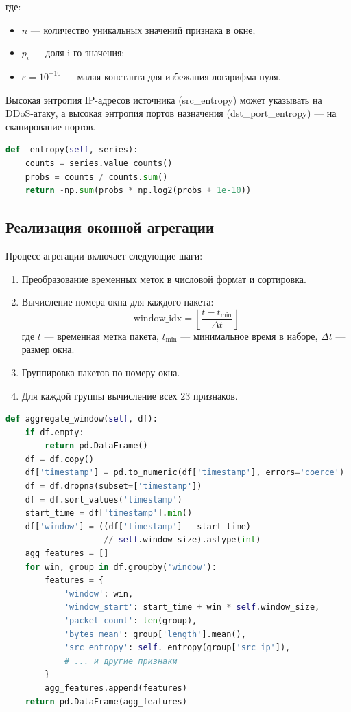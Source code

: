 где:
\begin{itemize}
    \item \(n\) — количество уникальных значений признака в окне;
    \item \(p_i\) — доля i-го значения;
    \item \(\varepsilon = 10^{-10}\) — малая константа для избежания логарифма нуля.
\end{itemize}

Высокая энтропия IP-адресов источника (src\_entropy) может указывать на DDoS-атаку, а высокая энтропия портов назначения (dst\_port\_entropy) — на сканирование портов.

\begin{lstlisting}[caption=Вычисление энтропии, label=lst:entropy, language=Python]
def _entropy(self, series):
    counts = series.value_counts()
    probs = counts / counts.sum()
    return -np.sum(probs * np.log2(probs + 1e-10))
\end{lstlisting}

\subsection{Реализация оконной агрегации}

Процесс агрегации включает следующие шаги:

\begin{enumerate}
    \item Преобразование временных меток в числовой формат и сортировка.
    \item Вычисление номера окна для каждого пакета:
    \[
    \text{window\_idx} = \left\lfloor \frac{t - t_{\min}}{\Delta t} \right\rfloor
    \]
    где \(t\) — временная метка пакета, \(t_{\min}\) — минимальное время в наборе, \(\Delta t\) — размер окна.
    \item Группировка пакетов по номеру окна.
    \item Для каждой группы вычисление всех 23 признаков.
\end{enumerate}

\begin{lstlisting}[caption=Метод агрегации окон, label=lst:aggregation, language=Python]
def aggregate_window(self, df):
    if df.empty:
        return pd.DataFrame()
    df = df.copy()
    df['timestamp'] = pd.to_numeric(df['timestamp'], errors='coerce')
    df = df.dropna(subset=['timestamp'])
    df = df.sort_values('timestamp')
    start_time = df['timestamp'].min()
    df['window'] = ((df['timestamp'] - start_time)
                    // self.window_size).astype(int)
    agg_features = []
    for win, group in df.groupby('window'):
        features = {
            'window': win,
            'window_start': start_time + win * self.window_size,
            'packet_count': len(group),
            'bytes_mean': group['length'].mean(),
            'src_entropy': self._entropy(group['src_ip']),
            # ... и другие признаки
        }
        agg_features.append(features)
    return pd.DataFrame(agg_features)
\end{lstlisting}
